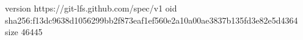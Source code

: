 version https://git-lfs.github.com/spec/v1
oid sha256:f13dc9638d1056299bb2f873eaf1ef560e2a10a00ae3837b135fd3e82e5d4364
size 46445
